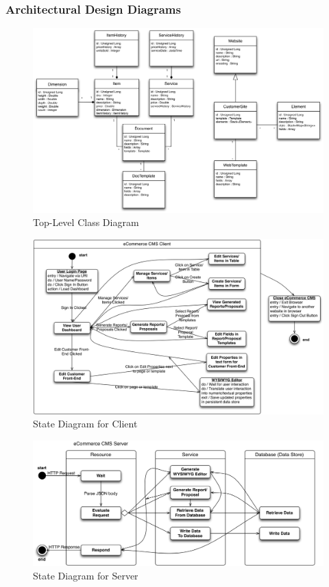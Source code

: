 \documentclass{article}
\begin{document}
\subsubsection{Architectural Design Diagrams}
\label{add}

\begin{figure}[H]
\centering
\includegraphics[width=6.5in]{../../UML/eccms-DomainObject Class Diagram.png}
\caption{Top-Level Class Diagram}
\label{server-class}
\end{figure}

\begin{figure}[H]
\centering
\includegraphics[width=6.5in]{../../UML/eccms-State (Client) Diagram.png}
\caption{State Diagram for Client}
\label{client-state}
\end{figure}

\begin{figure}[H]
\centering
\includegraphics[width=6.5in]{../../UML/eccms-State (Server) Diagram.png}
\caption{State Diagram for Server}
\label{server-state}
\end{figure}
\end{document}
